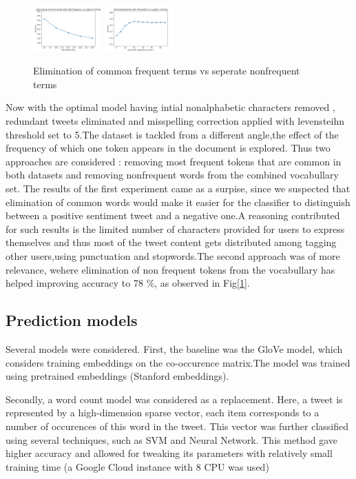 \documentclass[10pt,conference,compsocconf]{IEEEtran}
\begin{document}
\begin{figure}[!htb]
	\centering \includegraphics[width=100px]{../plots/commonElem.png}
	\centering \includegraphics[width=100px]{../plots/nonfrequent.png}
	\caption{Elimination of common frequent terms vs seperate nonfrequent terms}
	\label{freq}
\end{figure}
Now with the optimal model having intial nonalphabetic characters removed , redundant tweets eliminated and misspelling correction applied with levensteihn threshold set to 5.The dataset is tackled from a different angle,the effect of the frequency of which one token appears in the document is explored. Thus two approaches are considered : removing most frequent tokens that are common in both datasets and removing nonfrequent words from the combined vocabullary set. The results of the first experiment came as a surpise, since we suspected that elimination of common words would make it easier for the classifier to distinguish between a positive sentiment tweet and a negative one.A reasoning contributed for such results is the limited number of characters provided for users to express themselves and thus most of the tweet content gets distributed among tagging other users,using punctuation and stopwords.The second approach was of more relevance, wehere elimination of non frequent tokens from the vocabullary has helped improving accuracy to 78 \%, as observed in Fig[\ref{freq}].    

\subsection{Prediction models}
Several models were considered.
First, the baseline was the GloVe \cite{glove} model, which considers training embeddings on the co-occurence matrix.The model was trained using pretrained embeddings (Stanford embeddings). 

Secondly, a word count model was considered as a replacement.
Here, a tweet is represented by a high-dimension sparse vector, each item corresponds to a number of occurences of this word in the tweet.
This vector was further classified using several techniques, such as SVM and Neural Network.
This method gave higher accuracy and allowed for tweaking its parameters with relatively small training time (a Google Cloud instance with 8 CPU was used)
\vspace{5mm} %
\end{document}
